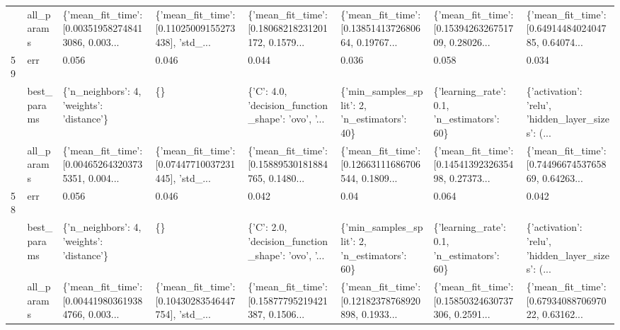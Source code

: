 \begin{tabular}{llllllll}
   & all\_params &  \{'mean\_fit\_time': [0.003519582748413086, 0.003... &  \{'mean\_fit\_time': [0.11025009155273438], 'std\_... &  \{'mean\_fit\_time': [0.18068218231201172, 0.1579... &  \{'mean\_fit\_time': [0.1385141372680664, 0.19767... &  \{'mean\_fit\_time': [0.1539426326751709, 0.28026... &  \{'mean\_fit\_time': [0.6491448402404785, 0.64074... \\
59 & err &                                              0.056 &                                              0.046 &                                              0.044 &                                              0.036 &                                              0.058 &                                              0.034 \\
   & best\_params &          \{'n\_neighbors': 4, 'weights': 'distance'\} &                                                 \{\} &  \{'C': 4.0, 'decision\_function\_shape': 'ovo', '... &       \{'min\_samples\_split': 2, 'n\_estimators': 40\} &         \{'learning\_rate': 0.1, 'n\_estimators': 60\} &  \{'activation': 'relu', 'hidden\_layer\_sizes': (... \\
   & all\_params &  \{'mean\_fit\_time': [0.004652643203735351, 0.004... &  \{'mean\_fit\_time': [0.07447710037231445], 'std\_... &  \{'mean\_fit\_time': [0.15889530181884765, 0.1480... &  \{'mean\_fit\_time': [0.12663111686706544, 0.1809... &  \{'mean\_fit\_time': [0.1454139232635498, 0.27373... &  \{'mean\_fit\_time': [0.7449667453765869, 0.64263... \\
58 & err &                                              0.056 &                                              0.046 &                                              0.042 &                                               0.04 &                                              0.064 &                                              0.042 \\
   & best\_params &          \{'n\_neighbors': 4, 'weights': 'distance'\} &                                                 \{\} &  \{'C': 2.0, 'decision\_function\_shape': 'ovo', '... &       \{'min\_samples\_split': 2, 'n\_estimators': 60\} &         \{'learning\_rate': 0.1, 'n\_estimators': 60\} &  \{'activation': 'relu', 'hidden\_layer\_sizes': (... \\
   & all\_params &  \{'mean\_fit\_time': [0.004419803619384766, 0.003... &  \{'mean\_fit\_time': [0.10430283546447754], 'std\_... &  \{'mean\_fit\_time': [0.15877795219421387, 0.1506... &  \{'mean\_fit\_time': [0.12182378768920898, 0.1933... &  \{'mean\_fit\_time': [0.15850324630737306, 0.2591... &  \{'mean\_fit\_time': [0.6793408870697022, 0.63162... \\
\bottomrule
\end{tabular}

